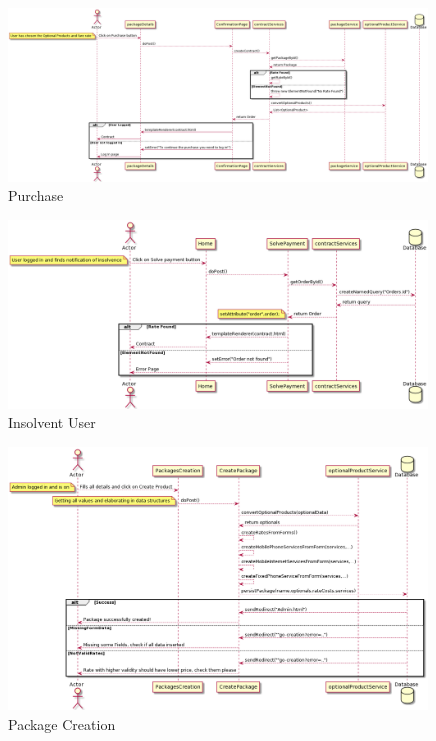 \documentclass{article}
\begin{document}
\begin{figure}[hbt!]
\centering
\includegraphics[width=0.99\textwidth]{Buy.png}
\caption{Purchase}
\end{figure}


\begin{figure}[hbt!]
\centering
\includegraphics[width=0.99\textwidth]{Insolvent.png}
\caption{Insolvent User}
\end{figure}

\begin{figure}[hbt!]
\centering
\includegraphics[width=0.99\textwidth]{Creation.png}
\caption{Package Creation}
\end{figure}
\end{document}
